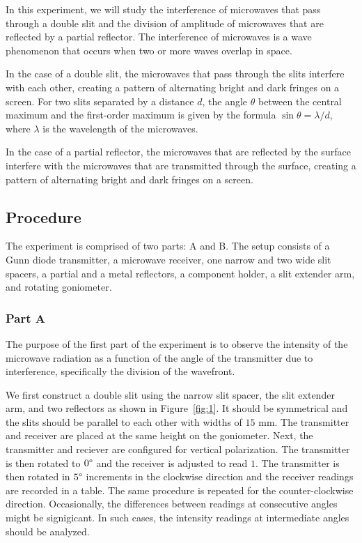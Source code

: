 \documentclass[10pt]{article}
\begin{document}
In this experiment, we will study the interference of microwaves that pass through a double slit and the division of amplitude of microwaves that are reflected by a partial reflector. The interference of microwaves is a wave phenomenon that occurs when two or more waves overlap in space. 

In the case of a double slit, the microwaves that pass through the slits interfere with each other, creating a pattern of alternating bright and dark fringes on a screen. For two slits separated by a distance $d$, the angle $\theta$ between the central maximum and the first-order maximum is given by the formula $\sin \theta = \lambda/d$, where $\lambda$ is the wavelength of the microwaves. 

In the case of a partial reflector, the microwaves that are reflected by the surface interfere with the microwaves that are transmitted through the surface, creating a pattern of alternating bright and dark fringes on a screen.

\subsection*{Procedure} 

The experiment is comprised of two parts: A and B. The setup consists of a Gunn diode transmitter, a microwave receiver, one narrow and two wide slit spacers, a partial and a metal reflectors, a component holder, a slit extender arm, and rotating goniometer.

\subsubsection*{Part A}

The purpose of the first part of the experiment is to observe the intensity of the microwave radiation as a function of the angle of the transmitter due to interference, specifically the division of the wavefront.

We first construct a double slit using the narrow slit spacer, the slit extender arm, and two reflectors as shown in Figure~\ref{fig:1}. It should be symmetrical and the slits should be parallel to each other with widths of $15$ mm. The transmitter and receiver are placed at the same height on the goniometer. Next, the transmitter and reciever are configured for vertical polarization. The transmitter is then rotated to $0\degree$ and the receiver is adjusted to read $1$. The transmitter is then rotated in $5\degree$ increments in the clockwise direction and the receiver readings are recorded in a table. The same procedure is repeated for the counter-clockwise direction. Occasionally, the differences between readings at consecutive angles might be signigicant. In such cases, the intensity readings at intermediate angles should be analyzed.
\end{document}
